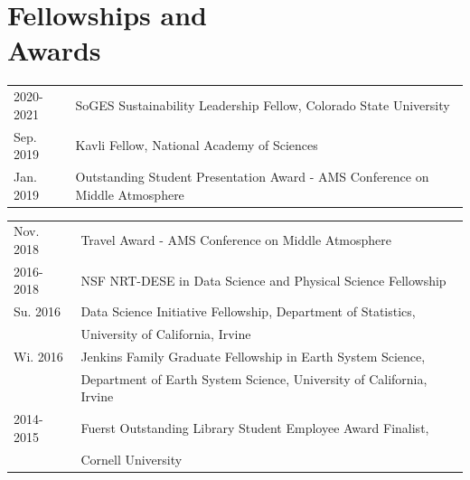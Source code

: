 \documentclass[margin,line,palatino,courier,10pt]{res}
\begin{document}
\begin{resume}
\begin{etaremune}[leftmargin=0in,topsep=0in,parsep=0in]
\end{etaremune}

\vspace{-0.1in}
\noindent\textcolor{Cerulean}{\makebox[\linewidth][r]{\rule{\textwidth}{5pt}}}
\vspace{-0.3in}

\section{\sc \textcolor{Cerulean}{\large{\textbf{Fellowships and\\ Awards}}}}
\begin{tabular}{@{}p{0.9in}p{4in}}
2020-2021 & SoGES Sustainability Leadership Fellow, Colorado State University\\
Sep. 2019 & Kavli Fellow, National Academy of Sciences\\
Jan. 2019 & Outstanding Student Presentation Award - AMS Conference on Middle Atmosphere\\
\end{tabular}
\begin{tabular}{@{}p{0.9in}p{4in}}
Nov. 2018 & Travel Award - AMS Conference on Middle Atmosphere\\
2016-2018 & NSF NRT-DESE in Data Science and Physical Science Fellowship\\
Su. 2016 & Data Science Initiative Fellowship, Department of Statistics, \\
& University of California, Irvine\\
Wi. 2016 & Jenkins Family Graduate Fellowship in Earth System Science,\\ 
& Department of Earth System
Science, University of California, Irvine\\
2014-2015 & Fuerst Outstanding Library Student Employee Award Finalist,\\
& Cornell University
\end{tabular}


\vspace{-0.1in}
\noindent\textcolor{Cerulean}{\makebox[\linewidth][r]{\rule{\textwidth}{5pt}}}
\vspace{-0.3in}


\end{resume}
\end{document}
